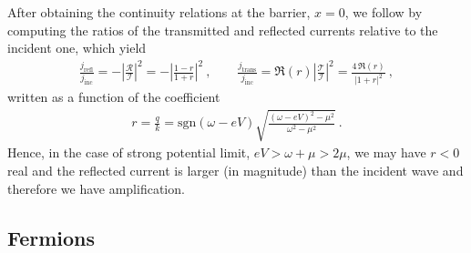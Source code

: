After obtaining the continuity relations at the barrier, $x=0$, we follow by computing the ratios of the transmitted and reflected currents relative to the incident one, which yield
\begin{align}
    \frac{j_\mathrm{refl}}{j_\mathrm{inc}} = - \left|\frac{\mathscr{R}}{\mathscr{I}}\right|^2 = -\left|\frac{1-r}{1+r}\right|^2  ~, \qquad \frac{j_\mathrm{trans}}{j_\mathrm{inc}} = \Re(r) \left|\frac{\mathscr{T}}{\mathscr{I}}\right|^2 = \frac{4\, \Re(r)}{|1+r|^2} ~,
    \label{eq1:KGcurrents}
\end{align}
written as a function of the coefficient 
\begin{align}
    r = \frac{q}{k} = \mathrm{sgn}(\omega - e V)  \sqrt{\frac{(\omega - e V)^2 - \mu^2}{\omega^2 - \mu^2}} ~.
    \label{eq1:KGr}
\end{align}
Hence, in the case of strong potential limit, $e V > \omega + \mu > 2 \mu$, we may have $r<0$ real and the reflected current is larger (in magnitude) than the incident wave and therefore we have amplification.

\subsection{Fermions}

